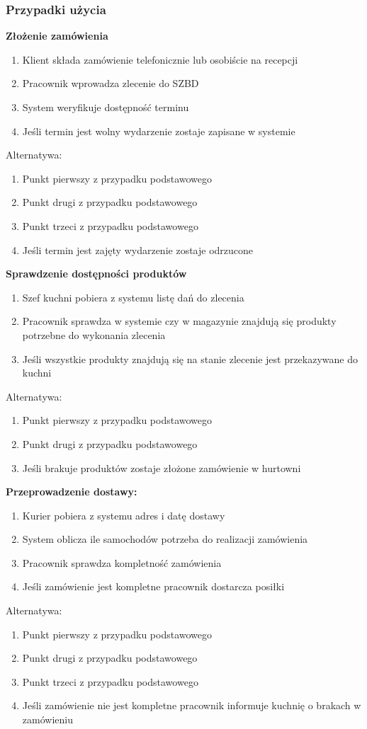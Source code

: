 \documentclass[10pt,a4paper]{article}
\begin{document}
\subsubsection{Przypadki użycia}
\noindent\textbf{Złożenie zamówienia}
\begin{enumerate}
    \item Klient składa zamówienie telefonicznie lub osobiście na recepcji
    \item Pracownik wprowadza zlecenie do SZBD
    \item System weryfikuje dostępność terminu
    \item Jeśli termin jest wolny wydarzenie zostaje zapisane w systemie
\end{enumerate}
Alternatywa:
\begin{enumerate}
    \item Punkt pierwszy z przypadku podstawowego
    \item Punkt drugi z przypadku podstawowego
    \item Punkt trzeci z przypadku podstawowego
    \item Jeśli termin jest zajęty wydarzenie zostaje odrzucone
\end{enumerate}
\textbf{Sprawdzenie dostępności produktów}
\begin{enumerate}
    \item Szef kuchni pobiera z systemu listę dań do zlecenia
    \item Pracownik sprawdza w systemie czy w magazynie znajdują się produkty potrzebne do wykonania zlecenia
    \item Jeśli wszystkie produkty znajdują się na stanie zlecenie jest przekazywane do kuchni
\end{enumerate}
Alternatywa:
\begin{enumerate}
    \item Punkt pierwszy z przypadku podstawowego
    \item Punkt drugi z przypadku podstawowego
    \item Jeśli brakuje produktów zostaje złożone zamówienie w hurtowni
\end{enumerate}
\textbf{Przeprowadzenie dostawy:}
\begin{enumerate}
    \item Kurier pobiera z systemu adres i datę dostawy
    \item System oblicza ile samochodów potrzeba do realizacji zamówienia
    \item Pracownik sprawdza kompletność zamówienia
    \item Jeśli zamówienie jest kompletne pracownik dostarcza posiłki
\end{enumerate}
Alternatywa:
\begin{enumerate}
    \item Punkt pierwszy z przypadku podstawowego
    \item Punkt drugi z przypadku podstawowego
    \item Punkt trzeci z przypadku podstawowego
    \item Jeśli zamówienie nie jest kompletne pracownik informuje kuchnię o brakach w zamówieniu
\end{enumerate}
\end{document}
